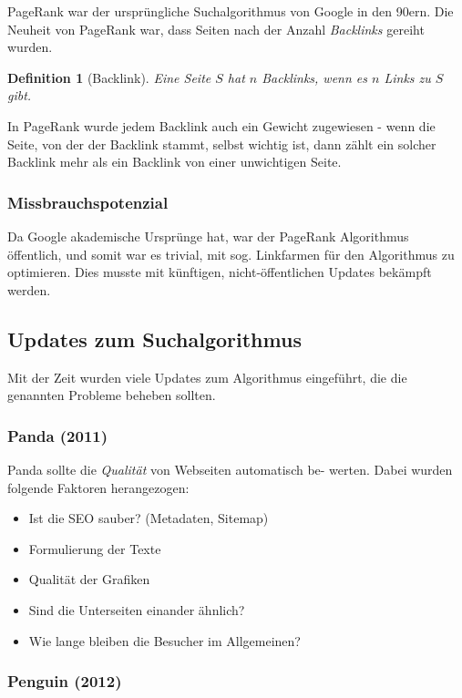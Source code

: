 \documentclass{article}
\newtheorem{definition}{Definition}
\begin{document}
PageRank war der ursprüngliche Suchalgorithmus von Google in den 90ern. Die Neuheit von PageRank war, dass Seiten nach der Anzahl \textit{Backlinks} gereiht wurden\cite{pr}.

\begin{definition}[Backlink]
Eine Seite $S$ hat $n$ Backlinks, wenn es $n$ Links zu $S$ gibt.
\end{definition}

In PageRank wurde jedem Backlink auch ein Gewicht zugewiesen - wenn die Seite, von der der Backlink stammt, selbst wichtig ist, dann zählt ein solcher Backlink mehr als ein Backlink von einer unwichtigen Seite.

\subsubsection{Missbrauchspotenzial}

Da Google akademische Ursprünge hat, war der PageRank Algorithmus öffentlich\cite{pr}, und somit war es trivial, mit sog. Linkfarmen für den Algorithmus zu optimieren. Dies musste mit künftigen, nicht-öffentlichen Updates bekämpft werden.

\subsection{Updates zum Suchalgorithmus}

Mit der Zeit wurden viele Updates zum Algorithmus eingeführt, die die genannten Probleme beheben sollten.

\subsubsection{Panda (2011)}

Panda sollte die \textit{Qualität} von Webseiten automatisch be- werten\cite{ah}. Dabei wurden folgende Faktoren herangezogen:

\begin{itemize}
    \item Ist die SEO sauber? (Metadaten, Sitemap)
    \item Formulierung der Texte
    \item Qualität der Grafiken
    \item Sind die Unterseiten einander ähnlich?
    \item Wie lange bleiben die Besucher im Allgemeinen?
\end{itemize}

\subsubsection{Penguin (2012)}
\end{document}
